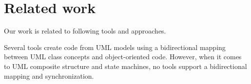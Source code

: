\section{Related work}
\label{sec:relatedwork}
Our work is related to following tools and approaches.

\noindent
{} 
Several tools \cite{ibm_rhapsody} create code from UML models using a bidirectional mapping between UML class concepts and object-oriented code.
However, when it comes to UML composite structure and state machines, no tools support a bidirectional mapping and synchronization. 

